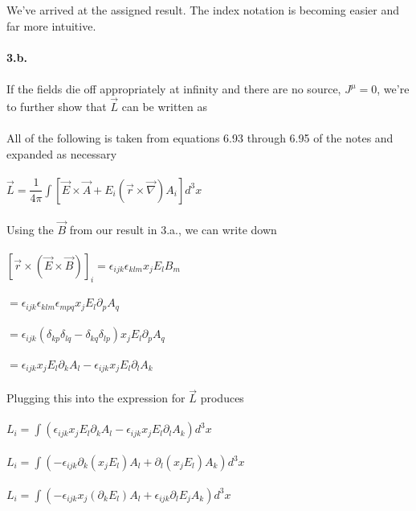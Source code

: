\documentclass[prb,preprint]
{revtex4-1}
\newcommand{\PRLsep}{\noindent\makebox[\linewidth]{\resizebox{0.8888\linewidth}{2pt}{$\bullet$}}\bigskip}
\begin{document}
\\
\\
We've arrived at the assigned result.  The index notation is becoming easier and far more intuitive.
\\
\\
\PRLsep
\newpage
\textbf{3.b.}
\\
\\
If the fields die off appropriately at infinity and there are no source, $J^\mu = 0$, we're to further show that $\vec{L}$ can be written as 
\\
\\
All of the following is taken from equations 6.93 through 6.95 of the notes and expanded as necessary
\\
\\
$\vec{L} = \dfrac{1}{4\pi}\int\left[ \vec{E} \times \vec{A} + E_i \left(\vec{r} \times \vec{\nabla}\right)A_i \right]d^3x$
\\
\\
Using the $\vec{B}$ from our result in 3.a., we can write down 
\\
\\
$\left[\vec{r}\times\left(\vec{E}\times\vec{B}\right)\right]_i = \epsilon_{ijk}\epsilon_{klm}x_j E_l B_m$
\\
\\
$= \epsilon_{ijk}\epsilon_{klm}\epsilon_{mpq} x_j E_l \partial_p A_q$
\\
\\
$= \epsilon_{ijk}\left(\delta_{kp}\delta_{lq} - \delta_{kq}\delta_{lp}\right) x_j E_l \partial_p A_q$
\\
\\
$= \epsilon_{ijk} x_j E_l \partial_k A_l - \epsilon_{ijk} x_j E_l \partial_l A_k$
\\
\\
Plugging this into the expression for $\vec{L}$ produces
\\
\\
$L_i = \int \left(\epsilon_{ijk} x_j E_l \partial_k A_l - \epsilon_{ijk} x_j E_l \partial_l A_k\right) d^3x$
\\
\\
$L_i = \int \left(-\epsilon_{ijk} \partial_k \left(x_j E_l\right) A_l + \partial_l\left( x_j E_l\right) A_k\right) d^3x$
\\
\\
$L_i = \int \left(-\epsilon_{ijk} x_j \left(\partial_k E_l\right) A_l + \epsilon_{ijk}\partial_l E_j A_k\right) d^3x$
\\
\\
\end{document}
